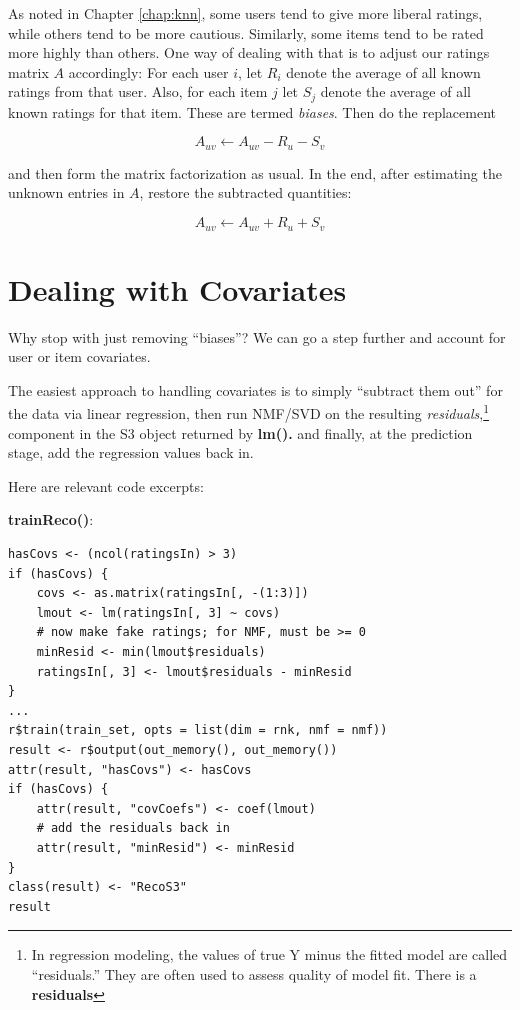 As noted in Chapter \ref{chap:knn}, some users tend to give more liberal
ratings, while others tend to be more cautious.  Similarly, some items
tend to be rated more highly than others.  One way of dealing with
that is to adjust our ratings matrix $A$ accordingly:  For each user
$i$, let $R_i$ denote the average of all known ratings from that user.
Also, for each item $j$ let $S_j$ denote the average of all known ratings
for that item.  These are termed \textit{biases}. Then do the replacement

\begin{equation}
A_{uv} \leftarrow A_{uv} - R_u - S_v
\end{equation}

and then form the matrix factorization as usual.  In the end, after
estimating the unknown entries in $A$, restore
the subtracted quantities:

\begin{equation}
A_{uv} \leftarrow A_{uv} + R_u + S_v
\end{equation}

\section{Dealing with Covariates}

Why stop with just removing ``biases''?  We can go a step further and
account for user or item covariates.

The easiest approach to handling covariates is to simply ``subtract them
out'' for the data via linear regression, then run NMF/SVD on the
resulting \textit{residuals},\footnote{In regression modeling, the
values of true Y minus the fitted model are called ``residuals.'' They
are often used to assess quality of model fit. There is a
\textbf{residuals}} component in the S3 object returned by
\textbf{lm().} and finally, at the prediction stage, add the regression
values back in.

Here are relevant code excerpts:

\textbf{trainReco()}:

\begin{lstlisting}
hasCovs <- (ncol(ratingsIn) > 3)
if (hasCovs) {
    covs <- as.matrix(ratingsIn[, -(1:3)])
    lmout <- lm(ratingsIn[, 3] ~ covs)
    # now make fake ratings; for NMF, must be >= 0
    minResid <- min(lmout$residuals)  
    ratingsIn[, 3] <- lmout$residuals - minResid
}
...
r$train(train_set, opts = list(dim = rnk, nmf = nmf))
result <- r$output(out_memory(), out_memory())
attr(result, "hasCovs") <- hasCovs
if (hasCovs) {
    attr(result, "covCoefs") <- coef(lmout)
    # add the residuals back in
    attr(result, "minResid") <- minResid
}
class(result) <- "RecoS3"
result
\end{lstlisting}

